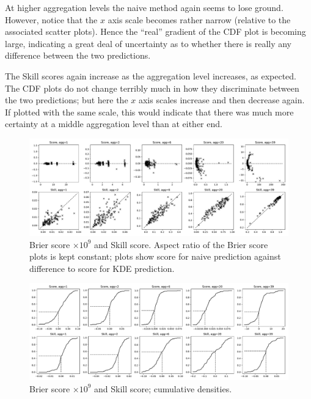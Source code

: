 \documentclass[twoside,a4paper,twocolumn,10pt]{article}
\theoremstyle{plain}
\theoremstyle{definition}
\begin{document}
At higher aggregation levels the naive method again seems to lose ground.  However, notice
that the $x$ axis scale becomes rather narrow (relative to the associated scatter plots).
Hence the ``real'' gradient of the CDF plot is becoming large, indicating a great deal of
uncertainty as to whether there is really any difference between the two predictions.

The Skill scores again increase as the aggregation level increases, as expected.
The CDF plots do not change terribly much in how they discriminate between the two
predictions; but here the $x$ axis scales increase and then decrease again.  If plotted
with the same scale, this would indicate that there was much more certainty at a middle
aggregation level than at either end.

\begin{figure}
	\includegraphics[width=\textwidth]{../details/multi_brier.pdf}
  \caption{Brier score $\times 10^9$ and Skill score.  Aspect ratio of the Brier score
  plots is kept constant; plots show score for naive prediction against difference to
  score for KDE prediction.}
   \label{fig:c1_brier_multi}
\end{figure}

\begin{figure}
	\includegraphics[width=\textwidth]{../details/multi_brier_cpd.pdf}
  \caption{Brier score $\times 10^9$ and Skill score; cumulative densities.}
   \label{fig:c1_brier_multi1}
\end{figure}
\end{document}
